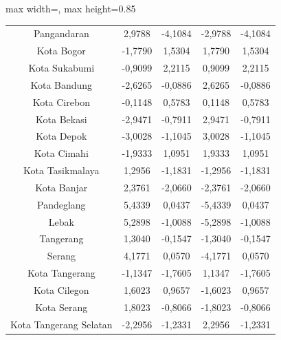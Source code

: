 \begin{table}[H]
\begin{adjustbox}{max width=\textwidth, max height=0.85\textheight}
\begin{tabular}{|c|c|c|c|c|}
Pangandaran & 2,9788 & -4,1084 & -2,9788 & -4,1084 \\
Kota Bogor & -1,7790 & 1,5304 & 1,7790 & 1,5304 \\
Kota Sukabumi & -0,9099 & 2,2115 & 0,9099 & 2,2115 \\
Kota Bandung & -2,6265 & -0,0886 & 2,6265 & -0,0886 \\
Kota Cirebon & -0,1148 & 0,5783 & 0,1148 & 0,5783 \\
Kota Bekasi & -2,9471 & -0,7911 & 2,9471 & -0,7911 \\
Kota Depok & -3,0028 & -1,1045 & 3,0028 & -1,1045 \\
Kota Cimahi & -1,9333 & 1,0951 & 1,9333 & 1,0951 \\
Kota Tasikmalaya & 1,2956 & -1,1831 & -1,2956 & -1,1831 \\
Kota Banjar & 2,3761 & -2,0660 & -2,3761 & -2,0660 \\
Pandeglang & 5,4339 & 0,0437 & -5,4339 & 0,0437 \\
Lebak & 5,2898 & -1,0088 & -5,2898 & -1,0088 \\
Tangerang & 1,3040 & -0,1547 & -1,3040 & -0,1547 \\
Serang & 4,1771 & 0,0570 & -4,1771 & 0,0570 \\
Kota Tangerang & -1,1347 & -1,7605 & 1,1347 & -1,7605 \\
Kota Cilegon & 1,6023 & 0,9657 & -1,6023 & 0,9657 \\
Kota Serang & 1,8023 & -0,8066 & -1,8023 & -0,8066 \\
Kota Tangerang Selatan & -2,2956 & -1,2331 & 2,2956 & -1,2331 \\
\hline
\end{tabular}
\end{adjustbox}
\end{table}